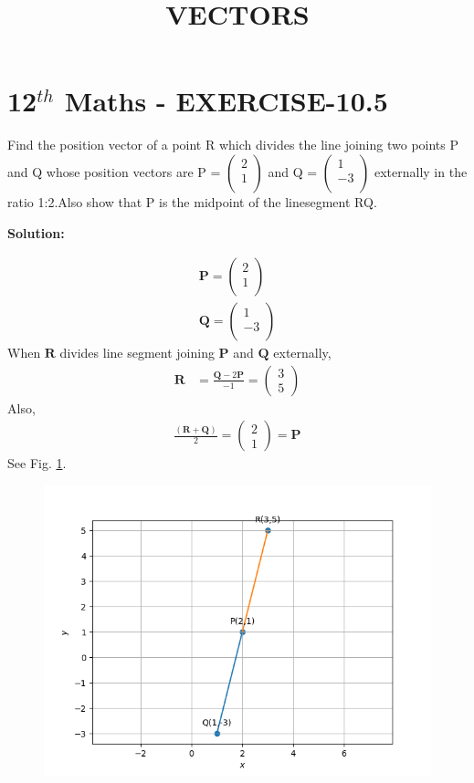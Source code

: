 \documentclass[10pt]{article}
\newcommand{\solution}{\noindent \textbf{Solution: }}
\newcommand{\myvec}[1]{\ensuremath{\begin{pmatrix}#1\end{pmatrix}}}
\let\vec\mathbf{}
\begin{document}
\begin{center}
\title{\textbf{VECTORS}}
\date{\vspace{-5ex}} %
\maketitle
\end{center}

\section*{12$^{th}$ Maths - EXERCISE-10.5}

Find the position vector of a point R which divides the line joining two points  P and Q whose position vectors are P = $\myvec{2\\ 1 \\}$ and Q = $\myvec{ 1\\-3\\ }$  externally in the ratio 1:2.Also show that P is the midpoint of the linesegment RQ.

\solution

\begin{align}
\vec{P} = \myvec{ 2\\1\\} 
 \label{eq1} \\
 \vec{Q} = \myvec{ 1\\-3\\}
\end{align}
\fi
When $\vec{R}$ divides line segment joining $\vec{P}$ and $\vec{Q}$ externally,
\begin{align}
\vec{R} &= \frac{\vec{Q} -2\vec{P}}{-1} 
= \myvec{3\\5}
\end{align}
Also,
\begin{align}
\frac{ (\vec{R} + \vec{Q})}{2}
=\myvec{2\\1} =\vec{P}
\end{align}
See Fig. 
\ref{fig:chapters/12/10/5/9/Figure1}.
\begin{figure}[!h]
	\begin{center}
		\includegraphics[width=\columnwidth]{chapters/12/10/5/9/figs/line.png}
	\end{center}
\caption{}
\label{fig:chapters/12/10/5/9/Figure1}
\end{figure}
\end{document}
